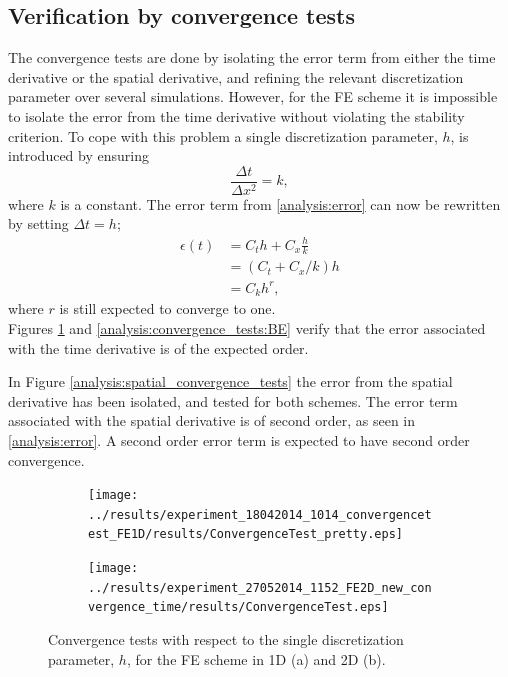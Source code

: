 \subsection{Verification by convergence tests}

The convergence tests are done by isolating the error term from either the time derivative or the spatial derivative, and refining the relevant discretization parameter over several simulations. 
However, for the FE scheme it is impossible to isolate the error from the time derivative without violating the stability criterion. 
To cope with this problem a single discretization parameter, $h$, is introduced by ensuring  
\begin{equation*}
 \frac{\Delta t}{\Delta x^2} = k,
\end{equation*}
where $k$ is a constant. 
The error term from \eqref{analysis:error} can now be rewritten by setting $\Delta t = h$;
\begin{align*}
 \epsilon(t) &= C_t h + C_x\frac{h}{k} \\
 &= (C_t +C_x/k)h \\
 &= C_k h^r,
\end{align*}
where $r$ is still expected to converge to one.  \\

\noindent Figures \ref{analysis:convergence_tests:FE} and \ref{analysis:convergence_tests:BE} verify that the error associated with the time derivative is of the expected order. 

In Figure \ref{analysis:spatial_convergence_tests} the error from the spatial derivative has been isolated, and tested for both schemes. 
The error term associated with the spatial derivative is of second order, as seen in \eqref{analysis:error}. A second order error term is expected to have second order convergence.

\begin{figure}[h]
\centering
 \begin{subfigure}{0.49\textwidth}
  \texttt{[image: ../results/experiment\_18042014\_1014\_convergencetest\_FE1D/results/ConvergenceTest\_pretty.eps]}
  \caption{}
 \end{subfigure}
 \begin{subfigure}{0.49\textwidth}
  \texttt{[image: ../results/experiment\_27052014\_1152\_FE2D\_new\_convergence\_time/results/ConvergenceTest.eps]}
  \caption{}
 \end{subfigure}
 \caption[Convergence tests in time FE scheme]{Convergence tests with respect to the single discretization parameter, $h$, for the FE scheme in 1D (a) and 2D (b). }
 \label{analysis:convergence_tests:FE}
\end{figure}

